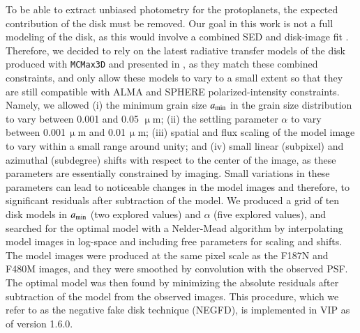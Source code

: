 \documentclass[longauth]{aa}
\begin{document}
\begin{appendix}
    To be able to extract unbiased photometry for the protoplanets, the expected contribution of the disk must be removed. %
    Our goal in this work is not a full modeling of the disk, as this would involve a combined SED and disk-image fit \citep[e.g.,][]{Keppler2018,Portilla-Revelo2022, Portilla-Revelo2023}. Therefore, we decided to rely on the latest radiative transfer models of the disk produced with \texttt{MCMax3D} \citep{Min2009} and presented in \citet{Portilla-Revelo2022, Portilla-Revelo2023}, %
    as they match these combined constraints, %
    and only allow these models to vary to a small extent so that they are still compatible with ALMA and SPHERE polarized-intensity constraints. %
    Namely,
    we allowed (i) the minimum grain size $a_{\rm min}$ in the grain size distribution to vary between 0.001 and 0.05 $\upmu$m; %
    (ii) the settling parameter $\alpha$ to vary between 0.001\,$\upmu$m and 0.01\,$\upmu$m; (iii) spatial and flux scaling of the model image to vary within a small range around unity; and (iv) small linear (subpixel) and azimuthal (subdegree) shifts with respect to the center of the image, as these parameters are essentially constrained by imaging. Small variations in these parameters can lead to noticeable changes in the model images and therefore, to significant residuals after subtraction of the model. %
    We produced a grid of ten disk models in $a_{\rm min}$ (two explored values) and $\alpha$ (five explored values), and searched for the optimal model with a Nelder-Mead algorithm by interpolating model images in log-space and including free parameters for scaling and shifts. The model images were produced at the same pixel scale as the F187N and F480M images, and they were smoothed by convolution with the observed PSF. The optimal model was then found by minimizing the absolute residuals after subtraction of the model from the observed images. 
    This procedure, which we refer to as the negative fake disk technique (NEGFD), is implemented in VIP as of version 1.6.0. 


\end{appendix}
\end{document}
